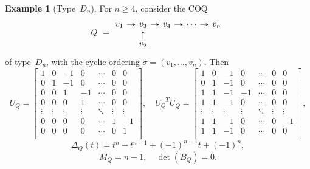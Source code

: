 \documentclass[11pt, letterpaper]{amsart}
\theoremstyle{definition}
\newtheorem{example}[theorem]{Example}
\numberwithin{equation}{section}
\begin{document}
\begin{example}[Type~$D_n$]
\label{eg:Dn-Alexander}
For $n\ge 4$, consider the COQ 
\begin{equation*}
Q\ =\begin{tikzcd}[arrows={-stealth}, sep=1em]
  v_1  \arrow[r]   & v_3  \arrow[r] & v_4 \arrow[r] & \cdots \arrow[r] & v_n \\
 & v_2  \arrow[u] 
   & 
\end{tikzcd}
\end{equation*}
of type~$D_n$, with the cyclic ordering $\sigma=(v_1,\dots,v_n)$.
Then
\begin{equation*}
U_Q= \begin{bmatrix} 
1 &  0 & -1 & 0 & \cdots & 0 & 0 \\ 
0 &  1 & -1 & 0 & \cdots & 0 & 0 \\ 
0 &  0 & 1  & -1 & \cdots & 0 & 0 \\
0 &  0 & 0  & 1 & \cdots & 0 & 0 \\
\vdots & \vdots & \vdots & \vdots & \ddots & \vdots & \vdots \\
0 &  0 & 0  & 0 & \cdots & 1 & -1 \\
0 &  0 & 0  & 0 & \cdots & 0 & 1 \\
\end{bmatrix}\!, 
\quad
U_Q^{-T}U_Q= \begin{bmatrix} 
1 &  0 & -1 & 0 & \cdots & 0 & 0 \\ 
0 &  1 & -1 & 0 & \cdots & 0 & 0 \\ 
1 &  1 & -1  & -1 & \cdots & 0 & 0 \\
1 &  1 & -1  & 0 & \cdots & 0 & 0 \\
\vdots & \vdots & \vdots & \vdots & \ddots & \vdots & \vdots \\
1 &  1 & -1  & 0 & \cdots & 0 & -1 \\
1 &  1 & -1  & 0 & \cdots & 0 & 0 \\
\end{bmatrix}\!, 
\end{equation*}
\begin{equation*}
\Delta_Q(t)=t^n-t^{n-1}+(-1)^{n-1}t+(-1)^n , 
\end{equation*}
\begin{equation*}
M_Q=n-1, \quad
\det(B_Q)= 0. 
\end{equation*}
\end{example}
\end{document}
